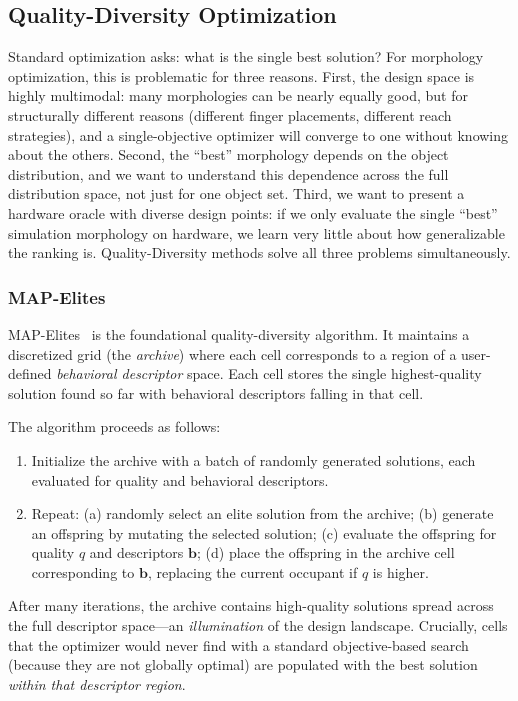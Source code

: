 \documentclass[journal]{IEEEtran}
\begin{document}
\subsection{Quality-Diversity Optimization}
\label{sec:related_qd}

\begin{notebox}
Standard optimization asks: what is the single best solution?
For morphology optimization, this is problematic for three reasons.
First, the design space is highly multimodal: many morphologies can be nearly equally good,
but for structurally different reasons (different finger placements, different reach strategies),
and a single-objective optimizer will converge to one without knowing about the others.
Second, the ``best'' morphology depends on the object distribution, and we want to understand
this dependence across the full distribution space, not just for one object set.
Third, we want to present a hardware oracle with diverse design points: if we only evaluate
the single ``best'' simulation morphology on hardware, we learn very little about how
generalizable the ranking is.
Quality-Diversity methods solve all three problems simultaneously.
\end{notebox}

\subsubsection{MAP-Elites}

MAP-Elites~\cite{mouret2015mapelites} is the foundational quality-diversity algorithm.
It maintains a discretized grid (the \emph{archive}) where each cell corresponds to a
region of a user-defined \emph{behavioral descriptor} space.
Each cell stores the single highest-quality solution found so far with behavioral
descriptors falling in that cell.

The algorithm proceeds as follows:
\begin{enumerate}
  \item Initialize the archive with a batch of randomly generated solutions,
    each evaluated for quality and behavioral descriptors.
  \item Repeat: (a) randomly select an elite solution from the archive;
    (b) generate an offspring by mutating the selected solution;
    (c) evaluate the offspring for quality $q$ and descriptors $\mathbf{b}$;
    (d) place the offspring in the archive cell corresponding to $\mathbf{b}$,
    replacing the current occupant if $q$ is higher.
\end{enumerate}
After many iterations, the archive contains high-quality solutions spread across the
full descriptor space---an \emph{illumination} of the design landscape.
Crucially, cells that the optimizer would never find with a standard objective-based
search (because they are not globally optimal) are populated with the best solution
\emph{within that descriptor region}.
\end{document}
